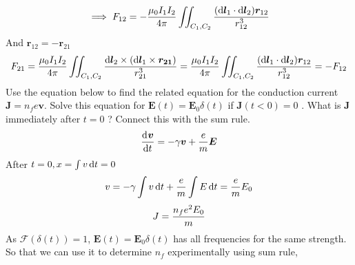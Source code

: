 \documentclass[UTF8,9pt]{ctexart}
\begin{document}
$$\implies F_{12}=-\frac{\mu_0I_1I_2}{4\pi}\iint_{C_1,C_2}\frac{(\mathop{}\!\mathrm{d}\bm{l}_1\cdot\mathop{}\!\mathrm{d}\bm{l}_2)\bm{r}_{12}}{r_{12}^3}$$
And $\bm{r}_{12}=-\bm{r}_{21}$
$$F_{21}=\frac{\mu_0I_1I_2}{4\pi}\iint_{C_1,C_2}\frac{\mathop{}\!\mathrm{d} \bm{l}_2\times(\mathop{}\!\mathrm{d}\bm{l}_1\times \bm{r_{21}})}{r_{21}^3}=\frac{\mu_0I_1I_2}{4\pi}\iint_{C_1,C_2}\frac{(\mathop{}\!\mathrm{d}\bm{l}_1\cdot\mathop{}\!\mathrm{d}\bm{l}_2)\bm{r}_{12}}{r_{12}^3}=-F_{12}$$
Use the equation below to find the related equation for the conduction current $\bm{J}=n_fe\bm{v}$. Solve this equation for $\bm{E}(t)=\bm{E}_0\delta(t)$ if $\bm{J}(t<0)=0$ . What is $\bm{J}$ immediately after $t=0$ ? Connect this with the sum rule.
$$\frac{\mathrm{d}^{} \bm{v}}{\mathrm{d} t^{}}=-\gamma\bm{v}+\frac{e}{m}\bm{E}$$
After $t=0, x=\int v\mathop{}\!\mathrm{d} t=0$ 
$$v=-\gamma\int v\mathop{}\!\mathrm{d} t+\frac{e}{m}\int E\mathop{}\!\mathrm{d} t = \frac{e}{m}E_0$$
$$J=\frac{n_fe^2E_0}{m}$$
As $\mathcal{F}(\delta(t))=1$, $\bm{E}(t)=\bm{E}_0\delta(t)$ has all frequencies for the same strength. So that we can use it to determine $n_f$ experimentally using sum rule, 
\end{document}
